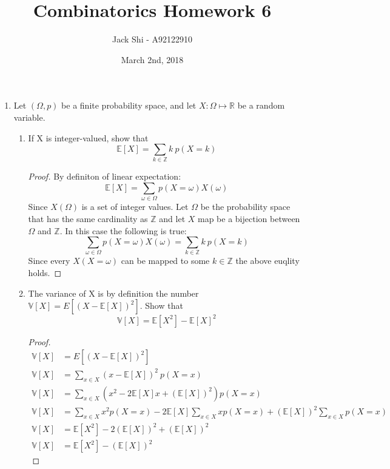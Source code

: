 \documentclass{article}
\title{Combinatorics Homework 6}
\author{Jack Shi - A92122910}
\date{March 2nd, 2018}
\begin{document}
\maketitle

\begin{enumerate} [label=(\arabic*)]
	\item Let $(\Omega, p)$ be a finite probability space, and let $X:\Omega
		\mapsto \mathbb{R}$ be a random variable.
		\begin{enumerate} [label=(\alph*)]
			\item If X is integer-valued, show that
				\begin{equation*}
					\mathbb{E}[X] = \sum_{k\in\mathbb{Z}}{k\ p(X=k)}
				\end{equation*}
				\begin{proof} By definiton of linear expectation:
					\begin{equation*}
						\mathbb{E}[X] = \sum_{\omega\in\Omega}{p(X=\omega)X(\omega)}
					\end{equation*}
					Since $X(\Omega)$ is a set of integer values. Let $\Omega$ be the
					probability space that has the same cardinality as $\mathbb{Z}$ and
					let $X$ map be a bijection between $\Omega$ and $\mathbb{Z}$. In this
					case the following is true:
				\begin{equation*}
					\sum_{\omega\in\Omega}{p(X=\omega)X(\omega)} = \sum_{k\in\mathbb{Z}}{k\ p(X=k)}
				\end{equation*}
				Since every $X(X = \omega)$ can be mapped to some $k \in \mathbb{Z}$
				the above euqlity holds.
			\end{proof}

		\item The variance of X is by definition the number $\mathbb{V}[X] =
			E[(X-\mathbb{E}[X])^2]$. Show that
			\begin{equation*}
				\mathbb{V}[X] = \mathbb{E}[X^2] - \mathbb{E}[X]^2
			\end{equation*}
			\begin{proof}
				\begin{align*}
					\mathbb{V}[X] &= E[(X-\mathbb{E}[X])^2] \\
					\mathbb{V}[X] &= \sum_{x \in X} (x-\mathbb{E}[X])^2\ p(X=x) \\
					\mathbb{V}[X] &= \sum_{x \in X}{(x^2 - 2\mathbb{E}[X] x +
						(\mathbb{E}[X])^2)p(X=x)} \\
					\mathbb{V}[X] &= \sum_{x \in X}{x^2p(X=x)} - 2\mathbb{E}[X] \sum_{x \in
						X}{xp(X=x)} + (\mathbb{E}[X])^2\sum_{x \in X}{p(X=x)} \\
					\mathbb{V}[X] &= \mathbb{E}[X^2] - 2(\mathbb{E}[X])^2 +
						(\mathbb{E}[X])^2 \\
					\mathbb{V}[X] &= \mathbb{E}[X^2] - (\mathbb{E}[X])^2
				\end{align*}
			\end{proof}
				

\end{enumerate}
\end{enumerate}
\end{document}
